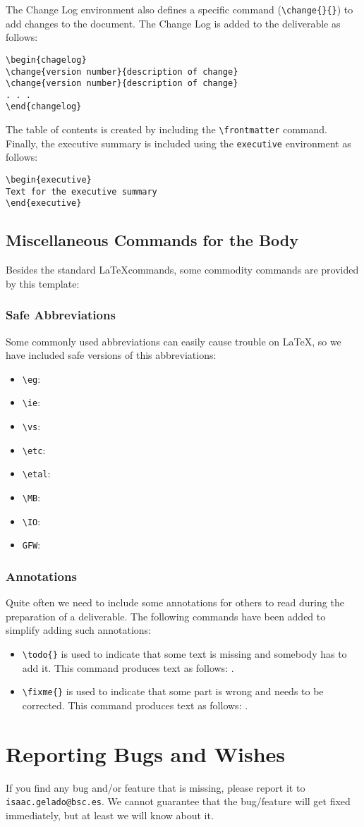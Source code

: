 \documentclass[11pt, a4paper, twoside]{montblanc}
\begin{document}
The Change Log environment also defines a specific command (\verb|\change{}{}|) to add changes to 
the document. The Change Log is added to the deliverable as follows:
\begin{verbatim}
\begin{chagelog}
\change{version number}{description of change}
\change{version number}{description of change}
. . .
\end{changelog}
\end{verbatim}


The table of contents is created by including the \verb|\frontmatter| command. Finally, the 
executive summary is included using the \texttt{executive} environment as follows:
\begin{verbatim}
\begin{executive}
Text for the executive summary
\end{executive}
\end{verbatim}

\subsection{Miscellaneous Commands for the Body}
Besides the standard \LaTeX commands, some commodity commands are provided by this template:

\subsubsection{Safe Abbreviations}
Some commonly used abbreviations can easily cause trouble on \LaTeX, so we have included safe 
versions of this abbreviations:
\begin{itemize}
\item \verb|\eg|: \eg
\item \verb|\ie|: \ie
\item \verb|\vs|: \vs
\item \verb|\etc|: \etc
\item \verb|\etal|: \etal
\item \verb|\MB|: \MB
\item \verb|\IO|: \IO
\item \verb|GFW|: \GFW
\end{itemize}

\subsubsection{Annotations}
Quite often we need to include some annotations for others to read during the preparation of a 
deliverable. The following commands have been added to simplify adding such annotations:
\begin{itemize}
\item \verb|\todo{}| is used to indicate that some text is missing and somebody has to add it. This 
command produces text as follows: .
\item \verb|\fixme{}| is used to indicate that some part is wrong and needs to be corrected. This 
command produces text as follows: .
\end{itemize}

\section{Reporting Bugs and Wishes}
If you find any bug and\slash or feature that is missing, please report it to 
\texttt{isaac.gelado@bsc.es}. We cannot guarantee that the bug\slash feature will get fixed 
immediately, but at least we will know about it.
\end{document}
